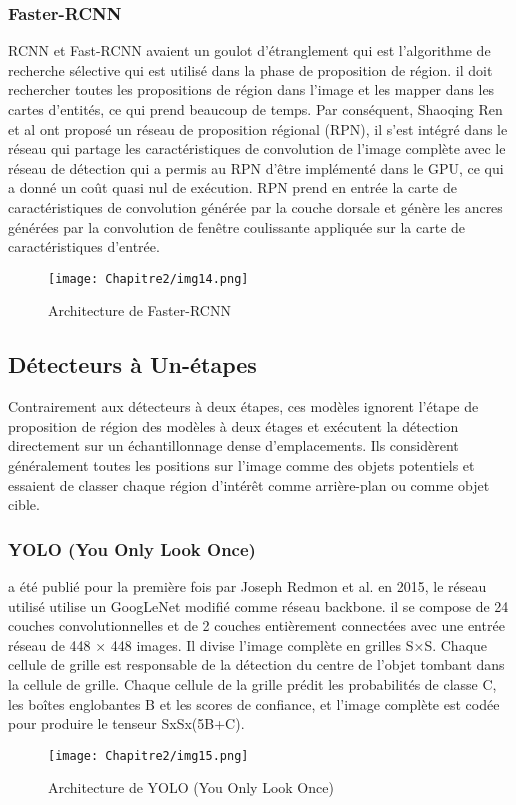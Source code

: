      \subsubsection{Faster-RCNN} \cite{faster_rcnn_paper}
     RCNN et Fast-RCNN avaient un goulot d'étranglement qui est l'algorithme de recherche sélective qui est utilisé dans la phase de proposition de région. il doit rechercher toutes les propositions de région dans l'image et les mapper dans les cartes d'entités, ce qui prend beaucoup de temps. Par conséquent, Shaoqing Ren et al ont proposé un réseau de proposition régional (RPN), il s'est intégré dans le réseau qui partage les caractéristiques de convolution de l'image complète avec le réseau de détection qui a permis au RPN d'être implémenté dans le GPU, ce qui a donné un coût quasi nul de exécution. RPN prend en entrée la carte de caractéristiques de convolution générée par la couche dorsale et génère les ancres générées par la convolution de fenêtre coulissante appliquée sur la carte de caractéristiques d'entrée.
     \begin{figure}[H]
          \centering
          \texttt{[image: Chapitre2/img14.png]}
          \caption{Architecture de Faster-RCNN}
          \label{img14}
          \end{figure}

     \subsection{Détecteurs à Un-étapes}
     Contrairement aux détecteurs à deux étapes, ces modèles ignorent l'étape de proposition de région des modèles à deux étages et exécutent la détection directement sur un échantillonnage dense d'emplacements. Ils considèrent généralement toutes les positions sur l'image comme des objets potentiels et essaient de classer chaque région d'intérêt comme arrière-plan ou comme objet cible.

     \subsubsection{YOLO (You Only Look Once)} \cite{yolo_paper}
     a été publié pour la première fois par Joseph Redmon et al. en 2015, le réseau utilisé utilise un GoogLeNet modifié comme réseau backbone. il se compose de 24 couches convolutionnelles et de 2 couches entièrement connectées avec une entrée réseau de 448 × 448 images. Il divise l'image complète en grilles S×S. Chaque cellule de grille est responsable de la détection du centre de l'objet tombant dans la cellule de grille. Chaque cellule de la grille prédit les probabilités de classe C, les boîtes englobantes B et les scores de confiance, et l'image complète est codée pour produire le tenseur SxSx(5B+C).
     \begin{figure}[H]
          \centering
          \texttt{[image: Chapitre2/img15.png]}
          \caption{Architecture de YOLO (You Only Look Once)}
          \label{img15}
          \end{figure}

